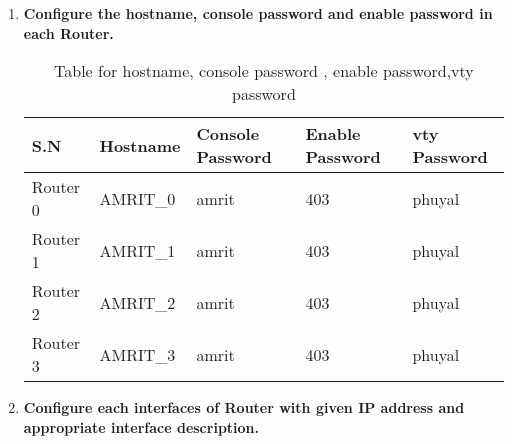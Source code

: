 \documentclass[a4paper,11pt]{article}
\begin{document}
\begin{enumerate}
    \item\textbf{Configure the hostname, console password and enable password in each Router.}




          \begin{table}[H]
              \centering
              \begin{tabular} {| m{6em}| m{6em}| m{9em} | m{8em}| m{7em} |}
                  \hline
                  {\cellcolor[rgb]{0.278,0.671,0.984}}\textbf{S.N} & \textbf{Hostname} & \textbf{Console Password} & \textbf{Enable Password} & \textbf{vty Password} \\
                  \hline
                  {\cellcolor[rgb]{0.278,0.671,0.984}}Router 0     & AMRIT\_0          & amrit                     & 403                      & phuyal                \\
                  \hline
                  {\cellcolor[rgb]{0.278,0.671,0.984}}Router 1     & AMRIT\_1          & amrit                     & 403                      & phuyal                \\
                  \hline
                  {\cellcolor[rgb]{0.278,0.671,0.984}}Router 2     & AMRIT\_2          & amrit                     & 403                      & phuyal                \\
                  \hline
                  {\cellcolor[rgb]{0.278,0.671,0.984}}Router 3     & AMRIT\_3          & amrit                     & 403                      & phuyal                \\
                  \hline
              \end{tabular}
              \caption{Table for hostname, console password , enable password,vty password}
          \end{table}


    \item\textbf{ Configure each interfaces of Router with given IP address and appropriate interface  description.}


\end{enumerate}
\end{document}
